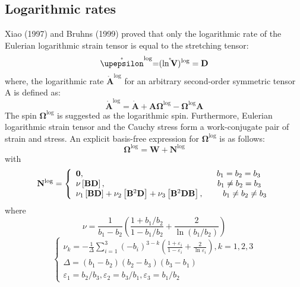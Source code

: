 \subsection{Logarithmic rates}
Xiao (1997) \cite{xiao1997logarithmic} and Bruhns (1999) \cite{Bruhns1999479} proved that only the logarithmic rate of the Eulerian logarithmic strain tensor is equal to the stretching tensor:
\begin{equation}
{\mathring {\mathbf{\upepsilon }}^{\log }}{\rm{ = }}{( {\mathring {\ln \mathbf{V}}} )^{\log }} = {\mathbf{D}}
\end{equation}
where, the logarithmic rate ${\mathring {\mathbf{A}}^{\log }}$ for an arbitrary second-order symmetric tensor A is defined as:
\begin{equation}
{\mathring {\mathbf{A}}^{\log }} = {\mathbf{\dot A}} + {\mathbf{A}}{{\mathbf{\Omega }}^{\log }} - {{\mathbf{\Omega }}^{\log }}{\mathbf{A}}
\end{equation}
The spin ${{\mathbf{\Omega }}^{\log }}$ is suggested as the logarithmic spin.
Furthermore, Eulerian logarithmic strain tensor and the Cauchy stress form a work-conjugate pair of strain and stress.
An explicit basis-free expression for ${{\mathbf{\Omega }}^{\log }}$ is as follows:
\begin{equation}
{{\mathbf{\Omega }}^{\log }} = {\mathbf{W}} + {{\mathbf{N}}^{\log }}
\end{equation}
with
\begin{equation}
{{\mathbf{N}}^{\log }} = \left\{ {\begin{array}{*{20}{l}}
{{\mathbf{0}},{\rm{\qquad\qquad\qquad\qquad\qquad\qquad\qquad\ \ \ \ \ \ }}{b_1} = {b_2} = {b_3}}\\
{\nu \left[ {{\mathbf{BD}}} \right],{\rm{\qquad\qquad\qquad\qquad\qquad\quad\ \ \ \ \ \ \ \,}}{b_1} \neq {b_2} = {b_3}}\\
{{\nu _1}\left[ {{\mathbf{BD}}} \right] + {\nu _2}\left[ {{{\mathbf{B}}^2}{\mathbf{D}}} \right] + {\nu _3}\left[ {{{\mathbf{B}}^2}{\mathbf{DB}}} \right],{\rm{\quad\ \ \ \ }}{b_1} \neq {b_2} \neq {b_3}}
\end{array}} \right.
\end{equation}
where
\begin{equation}
\nu  = \frac{1}{{{b_1} - {b_2}}}\left( {\frac{{1 + {b_1}/{b_2}}}{{1 - {b_1}/{b_2}}} + \frac{2}{{\ln \left( {{b_1}/{b_2}} \right)}}} \right)
\end{equation}
\begin{equation}
\left\{ {\begin{array}{*{20}{l}}
{{\nu _k} =  - \frac{1}{\Delta }\sum\limits_{i = 1}^3 {{{\left( { - {b_i}} \right)}^{3 - k}}\left( {\frac{{1 + {\varepsilon _i}}}{{1 - {\varepsilon _i}}} + \frac{2}{{\ln {\varepsilon _i}}}} \right)} ,k = 1,2,3}\\
{\Delta  = \left( {{b_1} - {b_2}} \right)\left( {{b_2} - {b_3}} \right)\left( {{b_3} - {b_1}} \right)}\\
{{\varepsilon _1} = {b_2}/{b_3},{\varepsilon _2} = {b_3}/{b_1},{\varepsilon _3} = {b_1}/{b_2}}
\end{array}} \right.
\end{equation}

